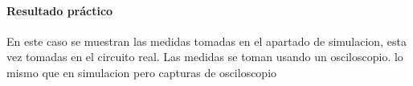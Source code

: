 \paragraph{Resultado práctico} En este caso se muestran las medidas tomadas en el apartado de simulacion, esta vez tomadas en el circuito real. Las medidas se toman usando un osciloscopio. 
lo mismo que en simulacion pero capturas de osciloscopio
